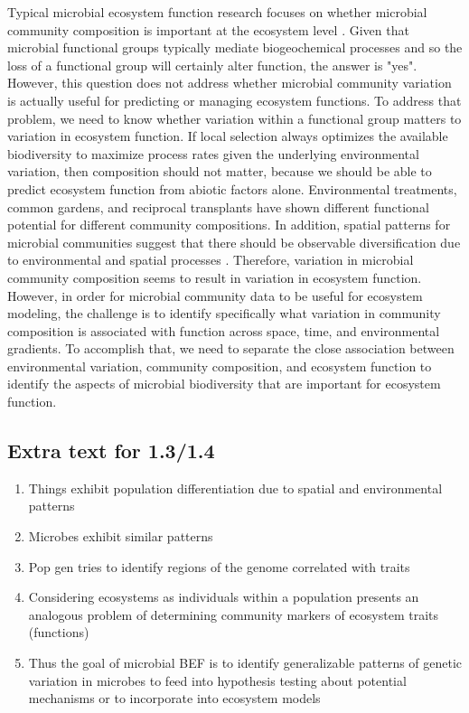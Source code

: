 \documentclass{article}
\begin{document}
Typical microbial ecosystem function research focuses on whether microbial
community composition is important at the ecosystem level
\citep{schimel1998, cavigelli2000, balser2005, graham2016}. Given that
microbial functional groups typically mediate biogeochemical processes
and so the loss of a functional group will certainly alter function,
the answer is "yes". However, this question does not address whether
microbial community variation is actually useful for predicting or 
managing ecosystem functions. To address that problem, we need to know
whether variation within a functional group matters to variation in
ecosystem function. If local selection always optimizes the available
biodiversity to maximize process rates given the underlying environmental
variation, then composition should not matter, because we should be able
to predict ecosystem function from abiotic factors alone. Environmental
treatments, common gardens, and reciprocal transplants have shown
different functional potential for different community compositions.
In addition, spatial patterns for microbial communities suggest that
there should be observable diversification due to environmental and
spatial processes \citep{wright1943, martiny2006}. Therefore, variation
in microbial community composition seems to result in variation in 
ecosystem function. However, in order for microbial community data to be
useful for ecosystem modeling, the challenge is to identify specifically what variation in community composition
is associated with function across space, time, and environmental gradients.
To accomplish that, we need to separate the close association between environmental variation, community
composition, and ecosystem function to identify the aspects of microbial
biodiversity that are important for ecosystem function.

\subsection*{Extra text for 1.3/1.4}

\begin{enumerate}
    \item Things exhibit population differentiation due to spatial and environmental 
    patterns \citep{wright1943}
    \item Microbes exhibit similar patterns \citep{martiny2006}
    \item Pop gen tries to identify regions of the genome correlated with
    traits
    \item Considering ecosystems as individuals within a population presents
    an analogous problem of determining community markers of ecosystem traits (functions)
    \item Thus the goal of microbial BEF is to identify generalizable patterns
    of genetic variation in microbes to feed into hypothesis testing about
    potential mechanisms or to incorporate into ecosystem models
\end{enumerate}
\end{document}
